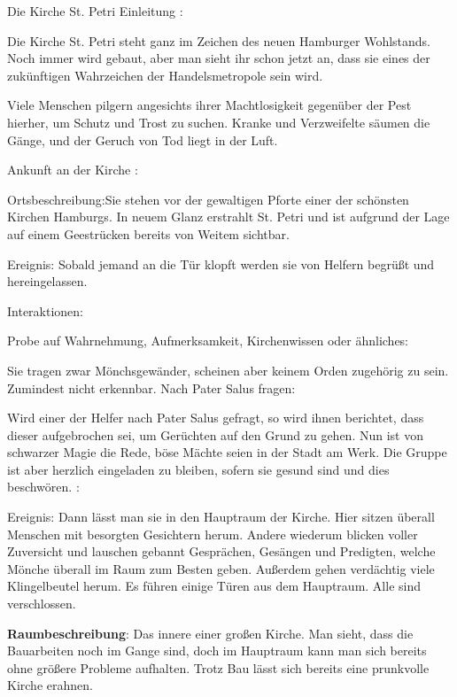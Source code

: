 






Die Kirche St. Petri
Einleitung
:

Die Kirche St. Petri steht ganz im Zeichen des neuen Hamburger Wohlstands. Noch immer wird gebaut, aber man sieht ihr schon jetzt an, dass sie eines der zukünftigen Wahrzeichen der Handelsmetropole sein wird.

Viele Menschen pilgern angesichts ihrer Machtlosigkeit gegenüber der Pest hierher, um Schutz und Trost zu suchen. Kranke und Verzweifelte säumen die Gänge, und der Geruch von Tod liegt in der Luft.


Ankunft an der Kirche
:

Ortsbeschreibung:Sie stehen vor der gewaltigen Pforte einer der schönsten Kirchen Hamburgs. In neuem Glanz erstrahlt St. Petri und ist aufgrund der Lage auf einem Geestrücken bereits von Weitem sichtbar.

Ereignis: Sobald jemand an die Tür klopft werden sie von Helfern begrüßt und hereingelassen.

Interaktionen:

Probe auf Wahrnehmung, Aufmerksamkeit, Kirchenwissen oder ähnliches:

Sie tragen zwar Mönchsgewänder, scheinen aber keinem Orden zugehörig zu sein.
Zumindest nicht erkennbar.
Nach Pater Salus fragen:

Wird einer der Helfer nach Pater Salus gefragt, so wird ihnen berichtet, dass dieser aufgebrochen sei, um Gerüchten auf den Grund zu gehen.
Nun ist von schwarzer Magie die Rede, böse Mächte seien in der Stadt am Werk. Die Gruppe ist aber herzlich eingeladen zu bleiben, sofern sie gesund sind und dies beschwören.
:

Ereignis: Dann lässt man sie in den Hauptraum der Kirche. Hier sitzen überall Menschen mit besorgten Gesichtern herum. Andere wiederum blicken voller Zuversicht und lauschen gebannt Gesprächen, Gesängen und Predigten, welche Mönche überall im Raum zum Besten geben. Außerdem gehen verdächtig viele Klingelbeutel herum. Es führen einige Türen aus dem Hauptraum. Alle sind verschlossen.

\textbf{Raumbeschreibung}: Das innere einer großen Kirche. Man sieht, dass die Bauarbeiten noch im Gange sind, doch im Hauptraum kann man sich bereits ohne größere Probleme aufhalten. Trotz Bau lässt sich bereits eine prunkvolle Kirche erahnen.

